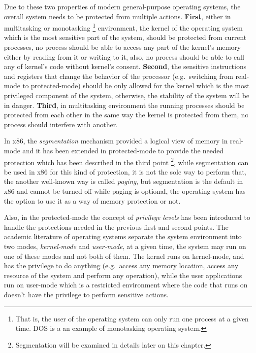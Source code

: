 Due to these two properties of modern general-purpose operating systems,
the overall system needs to be protected from multiple actions.
\textbf{First}, either in multitasking or monotasking \footnote{That is,
  the user of the operating system can only run one process at a given
  time. DOS is a an example of monotasking operating system.}
environment, the kernel of the operating system which is the most
sensitive part of the system, should be protected from current
processes, no process should be able to access any part of the kernel's
memory either by reading from it or writing to it, also, no process
should be able to call any of kernel's code without kernel's consent.
\textbf{Second}, the sensitive instructions and registers that change
the behavior of the processor (e.g.~switching from real-mode to
protected-mode) should be only allowed for the kernel which is the most
privileged component of the system, otherwise, the stability of the
system will be in danger. \textbf{Third}, in multitasking environment
the running processes should be protected from each other in the same
way the kernel is protected from them, no process should interfere with
another.

In x86, the \emph{segmentation} mechanism provided a logical view of
memory in real-mode and it has been extended in protected-mode to
provide the needed protection which has been described in the third
point \footnote{Segmentation will be examined in details later on this
  chapter.}, while segmentation can be used in x86 for this kind of
protection, it is not the sole way to perform that, the another
well-known way is called \emph{paging}, but segmentation is the default
in x86 and cannot be turned off while paging is optional, the operating
system has the option to use it as a way of memory protection or not.

Also, in the protected-mode the concept of \emph{privilege levels} has
been introduced to handle the protections needed in the previous first
and second points. The academic literature of operating systems separate
the system environment into two modes, \emph{kernel-mode} and
\emph{user-mode}, at a given time, the system may run on one of these
modes and not both of them. The kernel runs on kernel-mode, and has the
privilege to do anything (e.g.~access any memory location, access any
resource of the system and perform any operation), while the user
applications run on user-mode which is a restricted environment where
the code that runs on doesn't have the privilege to perform sensitive
actions.

